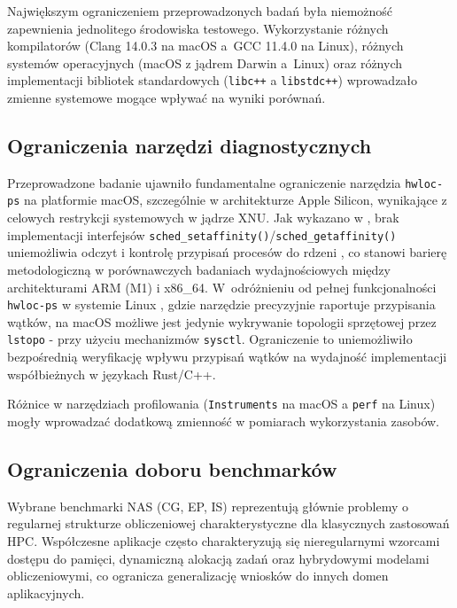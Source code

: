Największym ograniczeniem przeprowadzonych badań była niemożność zapewnienia jednolitego środowiska testowego. Wykorzystanie różnych kompilatorów (Clang 14.0.3 na macOS a~GCC 11.4.0 na Linux), różnych systemów operacyjnych (macOS z jądrem Darwin a~\mbox{Linux}) oraz różnych implementacji bibliotek standardowych (\texttt{libc++} a \texttt{libstdc++}) wprowadzało zmienne systemowe mogące wpływać na wyniki porównań.

\subsection{Ograniczenia narzędzi diagnostycznych}

Przeprowadzone badanie ujawniło fundamentalne ograniczenie narzędzia \texttt{hwloc-ps} na platformie macOS, szczególnie w architekturze Apple Silicon, wynikające z celowych restrykcji systemowych w jądrze XNU. Jak wykazano w \cite{HWLOC555}, brak implementacji interfejsów \texttt{sched\_setaffinity()}/\texttt{sched\_getaffinity()} uniemożliwia odczyt i kontrolę przypisań procesów do rdzeni , co stanowi barierę metodologiczną w porównawczych badaniach wydajnościowych między architekturami ARM (M1) i x86\_64. W~odróżnieniu od pełnej funkcjonalności \texttt{hwloc-ps} w systemie Linux \cite{hwlocHardwareLocality}, gdzie narzędzie precyzyjnie raportuje przypisania wątków, na macOS możliwe jest jedynie wykrywanie topologii sprzętowej przez \texttt{lstopo} - przy użyciu mechanizmów \texttt{sysctl}. Ograniczenie to uniemożliwiło bezpośrednią weryfikację wpływu przypisań wątków  na wydajność implementacji współbieżnych w językach Rust/C++.

Różnice w narzędziach profilowania (\texttt{Instruments} na macOS a \texttt{perf} na Linux) mogły wprowadzać dodatkową zmienność w pomiarach wykorzystania zasobów.

\subsection{Ograniczenia doboru benchmarków}

Wybrane benchmarki NAS (CG, EP, IS) reprezentują głównie problemy o regularnej strukturze obliczeniowej charakterystyczne dla klasycznych zastosowań HPC. Współczesne aplikacje często charakteryzują się nieregularnymi wzorcami dostępu do pamięci, dynamiczną alokacją zadań oraz hybrydowymi modelami obliczeniowymi, co ogranicza generalizację wniosków do innych domen aplikacyjnych.

